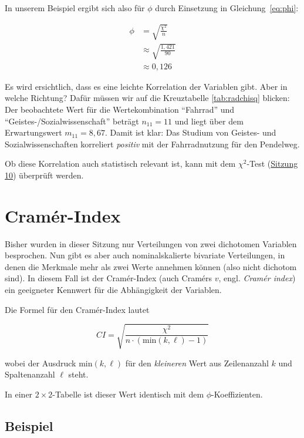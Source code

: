\documentclass[
  11pt,
  ngerman,
  a4paper,
]{report}
\begin{document}
In unserem Beispiel ergibt sich also für \(\phi\) durch Einsetzung in Gleichung~\eqref{eq:phi}:

\nopagebreak

\[
\begin{aligned}
\phi&=\sqrt{\frac{\chi^2}{n}}\\[6pt]
    &\approx\sqrt{\frac{1{,}421}{90}}\\[4pt]
    &\approx0{,}126
\end{aligned}
\]

Es wird ersichtlich, dass es eine leichte Korrelation der Variablen gibt. Aber in welche Richtung? Dafür müssen wir auf die Kreuztabelle \ref{tab:radchisq} blicken: Der beobachtete Wert für die Wertekombination \enquote{Fahrrad} und \enquote{Geistes-/Sozialwissenschaft} beträgt \(n_{11}=11\) und liegt über dem Erwartungswert \(m_{11}=8{,}67\). Damit ist klar: Das Studium von Geistes- und Sozialwissenschaften korreliert \emph{positiv} mit der Fahrradnutzung für den Pendelweg.

Ob diese Korrelation auch statistisch relevant ist, kann mit dem \(\chi^2\)-Test (\href{chi-quadrat-tests.html}{Sitzung 10}) überprüft werden.

\hypertarget{cramuxe9r-index}{%
\section{Cramér-Index}\label{cramuxe9r-index}}

Bisher wurden in dieser Sitzung nur Verteilungen von zwei dichotomen Variablen besprochen. Nun gibt es aber auch nominalskalierte bivariate Verteilungen, in denen die Merkmale mehr als zwei Werte annehmen können (also nicht dichotom sind). In diesem Fall ist der Cramér-Index (auch Cramérs \(v\), engl. \emph{Cramér index}) ein geeigneter Kennwert für die Abhängigkeit der Variablen.

Die Formel für den Cramér-Index lautet

\[
\mathit{CI}=\sqrt{\frac{\chi^2}{n\cdot (\mathrm{min}(k, \ell)-1)}}
\label{eq:ci}
\]

wobei der Ausdruck \(\mathrm{min}(k,\ell)\) für den \emph{kleineren} Wert aus Zeilenanzahl \(k\) und Spaltenanzahl \(\ell\) steht.

In einer \(2\times2\)-Tabelle ist dieser Wert identisch mit dem \(\phi\)-Koeffizienten.

\hypertarget{beispiel-34}{%
\subsection{Beispiel}\label{beispiel-34}}
\end{document}
